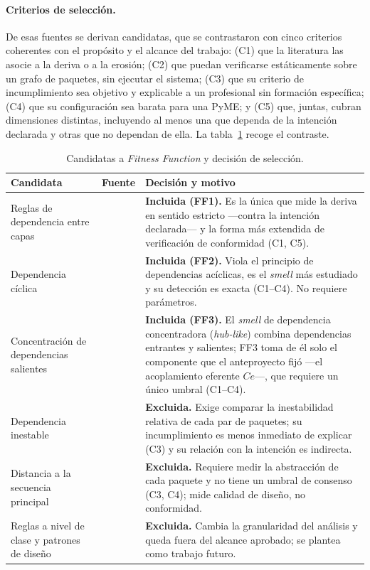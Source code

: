 \paragraph{Criterios de selección.} De esas fuentes se derivan candidatas, que se contrastaron con cinco criterios coherentes con el propósito y el alcance del trabajo: (C1) que la literatura las asocie a la deriva o a la erosión; (C2) que puedan verificarse estáticamente sobre un grafo de paquetes, sin ejecutar el sistema; (C3) que su criterio de incumplimiento sea objetivo y explicable a un profesional sin formación específica; (C4) que su configuración sea barata para una PyME; y (C5) que, juntas, cubran dimensiones distintas, incluyendo al menos una que dependa de la intención declarada y otras que no dependan de ella. La tabla~\ref{tab:candidatas} recoge el contraste.

\begin{table}[H]
\centering
\caption{Candidatas a \textit{Fitness Function} y decisión de selección.}
\label{tab:candidatas}
\footnotesize
\begin{tabularx}{\textwidth}{>{\raggedright\arraybackslash}p{3.3cm}>{\raggedright\arraybackslash}p{2.6cm}X}
\toprule
\textbf{Candidata} & \textbf{Fuente} & \textbf{Decisión y motivo} \\
\midrule
Reglas de dependencia entre capas & \citet{Murphy2001, KnodelPopescu2007, DeSilva2012} & \textbf{Incluida (FF1).} Es la única que mide la deriva en sentido estricto ---contra la intención declarada--- y la forma más extendida de verificación de conformidad (C1, C5). \\
Dependencia cíclica & \citet{Martin2003, Sas2019} & \textbf{Incluida (FF2).} Viola el principio de dependencias acíclicas, es el \textit{smell} más estudiado y su detección es exacta (C1--C4). No requiere parámetros. \\
Concentración de dependencias salientes & \citet{Martin2003, ArcelliFontana2016, Sas2019} & \textbf{Incluida (FF3).} El \textit{smell} de dependencia concentradora (\textit{hub-like}) combina dependencias entrantes y salientes; FF3 toma de él solo el componente que el anteproyecto fijó ---el acoplamiento eferente $Ce$---, que requiere un único umbral (C1--C4). \\
Dependencia inestable & \citet{Martin2003, Sas2019} & \textbf{Excluida.} Exige comparar la inestabilidad relativa de cada par de paquetes; su incumplimiento es menos inmediato de explicar (C3) y su relación con la intención es indirecta. \\
Distancia a la secuencia principal & \citet{Martin2003} & \textbf{Excluida.} Requiere medir la abstracción de cada paquete y no tiene un umbral de consenso (C3, C4); mide calidad de diseño, no conformidad. \\
Reglas a nivel de clase y patrones de diseño & \citet{ArchUnit} & \textbf{Excluida.} Cambia la granularidad del análisis y queda fuera del alcance aprobado; se plantea como trabajo futuro. \\
\bottomrule
\end{tabularx}
\end{table}

